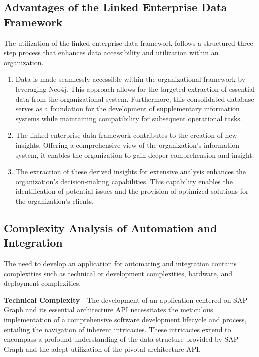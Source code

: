\documentclass{article}
\begin{document}
\maketitle
\subsection{Advantages of the Linked Enterprise Data Framework}

The utilization of the linked enterprise data framework follows a structured three-step process that enhances data accessibility and utilization within an organization.

\begin{enumerate}
    \item Data is made seamlessly accessible within the organizational framework by leveraging Neo4j. This approach allows for the targeted extraction of essential data from the organizational system. Furthermore, this consolidated database serves as a foundation for the development of supplementary information systems while maintaining compatibility for subsequent operational tasks.
    
    \item The linked enterprise data framework contributes to the creation of new insights. Offering a comprehensive view of the organization's information system, it enables the organization to gain deeper comprehension and insight.
    
    \item The extraction of these derived insights for extensive analysis enhances the organization's decision-making capabilities. This capability enables the identification of potential issues and the provision of optimized solutions for the organization's clients.
\end{enumerate}

\subsection{Complexity Analysis of Automation and Integration}

The need to develop an application for automating and integration contains complexities such as technical or development complexities, hardware, and deployment complexities.

\textbf{Technical Complexity} - The development of an application centered on SAP Graph and its essential architecture API necessitates the meticulous implementation of a comprehensive software development lifecycle and process, entailing the navigation of inherent intricacies. These intricacies extend to encompass a profound understanding of the data structure provided by SAP Graph and the adept utilization of the pivotal architecture API.
\end{document}
